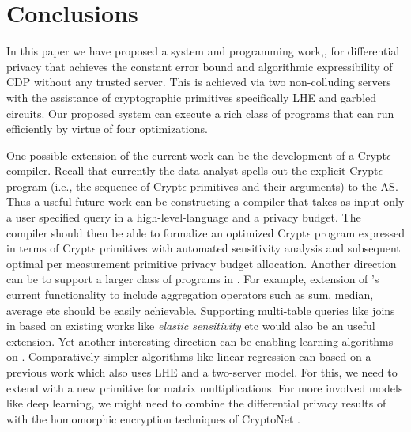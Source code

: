 
\vspace{-0.3cm}\section{Conclusions}\label{sec:conclusions}
In this paper we have proposed a system and programming work,\system, for differential privacy that achieves the constant error bound and  algorithmic expressibility of \textsf{CDP} without any trusted server. This is achieved via two non-colluding servers with the assistance of cryptographic primitives specifically \textsf{LHE} and garbled circuits. Our proposed system \system can execute a rich class of programs that can run  efficiently by virtue of four optimizations.
\par  One possible extension of the current work can be the development of a
Crypt$\epsilon$ compiler. Recall that currently the data analyst spells out the explicit Crypt$\epsilon$ program  (i.e., the sequence of Crypt$\epsilon$ primitives and their arguments) to the \textsf{AS}. Thus a useful future work can be constructing a compiler that takes as input only a user specified query in a high-level-language and a  privacy budget. The
compiler should then be able to formalize an optimized Crypt$\epsilon$ program expressed in terms of Crypt$\epsilon$ primitives with automated sensitivity analysis and subsequent optimal per measurement primitive privacy budget allocation. 
Another direction can be to support a larger class of programs in \system. For example, extension of \system's current functionality to include aggregation operators such as sum, median, average etc should be easily achievable. Supporting  multi-table queries like joins in \system based on existing works like \emph{elastic sensitivity} \cite{elastic} etc would also be an useful extension.  Yet another interesting direction can be enabling learning algorithms on \system.   Comparatively simpler algorithms like linear regression can based on a previous work \cite{LReg} which also uses \textsf{LHE} and a two-server model. For this, we need to extend \system with a new primitive for matrix multiplications. For more involved models like deep learning, we might need to combine the differential privacy results of \cite{DLDP} with the homomorphic encryption techniques of  CryptoNet \cite{CryptoNet}. %
